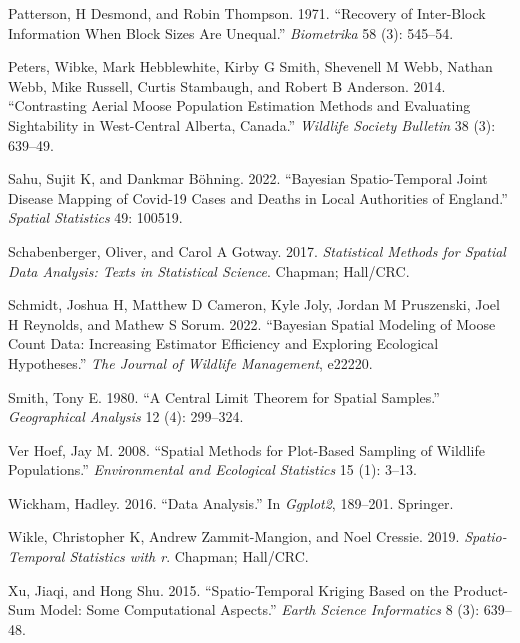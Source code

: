 \documentclass[]{article}    %
\newlength{\cslhangindent}
\newlength{\cslentryspacingunit} %
\newenvironment{CSLReferences}[2] %
 {%
  \setlength{\parindent}{0pt}
  \ifodd #1
  \let\oldpar\par
  \def\par{\hangindent=\cslhangindent\oldpar}
  \fi
  \setlength{\parskip}{#2\cslentryspacingunit}
 }%
 {}
\begin{document}
\begin{CSLReferences}{1}{0}
\leavevmode{}%
Patterson, H Desmond, and Robin Thompson. 1971. {``Recovery of
Inter-Block Information When Block Sizes Are Unequal.''}
\emph{Biometrika} 58 (3): 545--54.

\leavevmode{}%
Peters, Wibke, Mark Hebblewhite, Kirby G Smith, Shevenell M Webb, Nathan
Webb, Mike Russell, Curtis Stambaugh, and Robert B Anderson. 2014.
{``Contrasting Aerial Moose Population Estimation Methods and Evaluating
Sightability in West-Central Alberta, Canada.''} \emph{Wildlife Society
Bulletin} 38 (3): 639--49.

\leavevmode{}%
Sahu, Sujit K, and Dankmar Böhning. 2022. {``Bayesian Spatio-Temporal
Joint Disease Mapping of Covid-19 Cases and Deaths in Local Authorities
of England.''} \emph{Spatial Statistics} 49: 100519.

\leavevmode{}%
Schabenberger, Oliver, and Carol A Gotway. 2017. \emph{Statistical
Methods for Spatial Data Analysis: Texts in Statistical Science}.
Chapman; Hall/CRC.

\leavevmode{}%
Schmidt, Joshua H, Matthew D Cameron, Kyle Joly, Jordan M Pruszenski,
Joel H Reynolds, and Mathew S Sorum. 2022. {``Bayesian Spatial Modeling
of Moose Count Data: Increasing Estimator Efficiency and Exploring
Ecological Hypotheses.''} \emph{The Journal of Wildlife Management},
e22220.

\leavevmode{}%
Smith, Tony E. 1980. {``A Central Limit Theorem for Spatial Samples.''}
\emph{Geographical Analysis} 12 (4): 299--324.

\leavevmode{}%
Ver Hoef, Jay M. 2008. {``Spatial Methods for Plot-Based Sampling of
Wildlife Populations.''} \emph{Environmental and Ecological Statistics}
15 (1): 3--13.

\leavevmode{}%
Wickham, Hadley. 2016. {``Data Analysis.''} In \emph{Ggplot2}, 189--201.
Springer.

\leavevmode{}%
Wikle, Christopher K, Andrew Zammit-Mangion, and Noel Cressie. 2019.
\emph{Spatio-Temporal Statistics with r}. Chapman; Hall/CRC.

\leavevmode{}%
Xu, Jiaqi, and Hong Shu. 2015. {``Spatio-Temporal Kriging Based on the
Product-Sum Model: Some Computational Aspects.''} \emph{Earth Science
Informatics} 8 (3): 639--48.

\end{CSLReferences}
\end{document}
